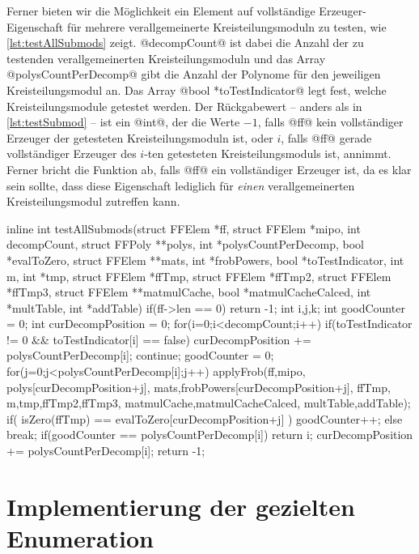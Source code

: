 Ferner bieten wir die Möglichkeit ein Element auf vollständige
Erzeuger-Eigenschaft für mehrere verallgemeinerte Kreisteilungsmoduln zu
testen, wie \autoref{lst:testAllSubmods} zeigt. @decompCount@ ist dabei die
Anzahl der zu testenden verallgemeinerten Kreisteilungsmoduln und das Array
@polysCountPerDecomp@ gibt die Anzahl der Polynome für den jeweiligen
Kreisteilungsmodul an. Das Array @bool *toTestIndicator@ legt fest, welche
Kreisteilungsmodule getestet werden. Der Rückgabewert -- anders als in 
\autoref{lst:testSubmod} -- ist ein @int@, der die Werte $-1$, falls @ff@ kein
vollständiger Erzeuger der getesteten Kreisteilungsmoduln ist, oder $i$, falls
@ff@ gerade vollständiger Erzeuger des $i$-ten getesteten Kreisteilungsmoduls
ist, annimmt. Ferner bricht die Funktion ab, falls @ff@ ein vollständiger
Erzeuger ist, da es klar sein sollte, dass diese Eigenschaft lediglich für
\emph{einen} verallgemeinerten Kreisteilungsmodul zutreffen kann.

\begin{ccode}[caption={Aus \url{../Sage/enumeratePCNs.c}},
  label=lst:testAllSubmods]
inline int testAllSubmods(struct FFElem *ff, struct FFElem *mipo, 
        int decompCount, struct FFPoly **polys,
        int *polysCountPerDecomp, bool *evalToZero, 
        struct FFElem **mats, int *frobPowers, bool *toTestIndicator,
        int m, int *tmp, 
        struct FFElem *ffTmp, struct FFElem *ffTmp2, struct FFElem *ffTmp3,
        struct FFElem **matmulCache, bool *matmulCacheCalced,
        int *multTable, int *addTable){
    if(ff->len == 0) return -1;
    int i,j,k;
    int goodCounter = 0;
    int curDecompPosition = 0;
    for(i=0;i<decompCount;i++){
        if(toTestIndicator != 0 && toTestIndicator[i] == false){
            curDecompPosition += polysCountPerDecomp[i];
            continue;
        }
        goodCounter = 0;
        for(j=0;j<polysCountPerDecomp[i];j++){
            applyFrob(ff,mipo,
                    polys[curDecompPosition+j],
                    mats,frobPowers[curDecompPosition+j], ffTmp,
                    m,tmp,ffTmp2,ffTmp3,
                    matmulCache,matmulCacheCalced,
                    multTable,addTable);
            if( isZero(ffTmp) == evalToZero[curDecompPosition+j] ){
                goodCounter++;
            }else break;
        }
        if(goodCounter == polysCountPerDecomp[i]){
            return i;
        }
        curDecompPosition += polysCountPerDecomp[i];
    }
    return -1;
}
\end{ccode}


\section{Implementierung der gezielten Enumeration}

